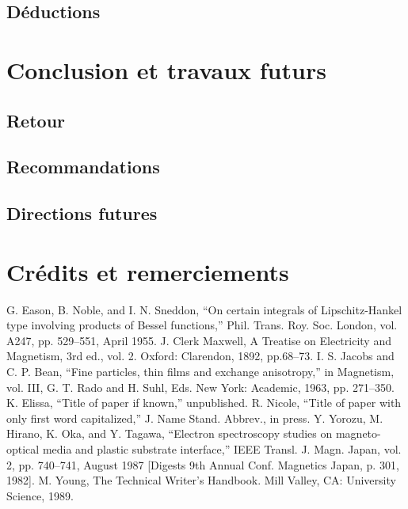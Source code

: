\documentclass[conference]{IEEEtran}
\begin{document}
\subsection{Déductions}

\section{Conclusion et travaux futurs}

\subsection{Retour}

\subsection{Recommandations}

\subsection{Directions futures}

\section{Crédits et remerciements}

\begin{thebibliography}{00}
 G. Eason, B. Noble, and I. N. Sneddon, ``On certain integrals of Lipschitz-Hankel type involving products of Bessel functions,'' Phil. Trans. Roy. Soc. London, vol. A247, pp. 529--551, April 1955.
 J. Clerk Maxwell, A Treatise on Electricity and Magnetism, 3rd ed., vol. 2. Oxford: Clarendon, 1892, pp.68--73.
 I. S. Jacobs and C. P. Bean, ``Fine particles, thin films and exchange anisotropy,'' in Magnetism, vol. III, G. T. Rado and H. Suhl, Eds. New York: Academic, 1963, pp. 271--350.
 K. Elissa, ``Title of paper if known,'' unpublished.
 R. Nicole, ``Title of paper with only first word capitalized,'' J. Name Stand. Abbrev., in press.
 Y. Yorozu, M. Hirano, K. Oka, and Y. Tagawa, ``Electron spectroscopy studies on magneto-optical media and plastic substrate interface,'' IEEE Transl. J. Magn. Japan, vol. 2, pp. 740--741, August 1987 [Digests 9th Annual Conf. Magnetics Japan, p. 301, 1982].
 M. Young, The Technical Writer's Handbook. Mill Valley, CA: University Science, 1989.
\end{thebibliography}
\end{document}
